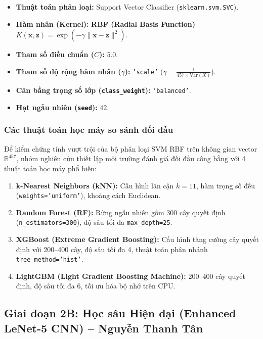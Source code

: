\documentclass[a4paper, 11pt]{article}
\begin{document}
\begin{itemize}
    \item \textbf{Thuật toán phân loại:} Support Vector Classifier (\texttt{sklearn.svm.SVC}).
    \item \textbf{Hàm nhân (Kernel):} \textbf{RBF (Radial Basis Function)} $K(\mathbf{x}, \mathbf{z}) = \exp(-\gamma \|\mathbf{x} - \mathbf{z}\|^2)$.
    \item \textbf{Tham số điều chuẩn ($C$):} $5.0$.
    \item \textbf{Tham số độ rộng hàm nhân ($\gamma$):} \texttt{'scale'} ($\gamma = \frac{1}{457 \times \text{Var}(X)}$).
    \item \textbf{Cân bằng trọng số lớp (\texttt{class\_weight}):} \texttt{'balanced'}.
    \item \textbf{Hạt ngẫu nhiên (\texttt{seed}):} $42$.
\end{itemize}

\subsubsection{Các thuật toán học máy so sánh đối đầu}
\label{subsubsec:other_ml_models}

Để kiểm chứng tính vượt trội của bộ phân loại SVM RBF trên không gian vector $\mathbb{R}^{457}$, nhóm nghiên cứu thiết lập môi trường đánh giá đối đầu công bằng với 4 thuật toán học máy phổ biến:
\begin{enumerate}
    \item \textbf{k-Nearest Neighbors (kNN):} Cấu hình lân cận $k=11$, hàm trọng số đều (\texttt{weights='uniform'}), khoảng cách Euclidean.
    \item \textbf{Random Forest (RF):} Rừng ngẫu nhiên gồm 300 cây quyết định (\texttt{n\_estimators=300}), độ sâu tối đa \texttt{max\_depth=25}.
    \item \textbf{XGBoost (Extreme Gradient Boosting):} Cấu hình tăng cường cây quyết định với 200--400 cây, độ sâu tối đa 4, thuật toán phân nhánh \texttt{tree\_method='hist'}.
    \item \textbf{LightGBM (Light Gradient Boosting Machine):} 200--400 cây quyết định, độ sâu tối đa 6, tối ưu hóa bộ nhớ trên CPU.
\end{enumerate}

\subsection{Giai đoạn 2B: Học sâu Hiện đại (Enhanced LeNet-5 CNN) -- Nguyễn Thanh Tân}
\label{subsec:stage2_lenet}
\end{document}
